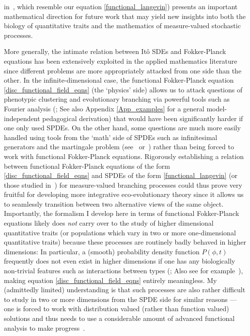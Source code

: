in~\cite{week_white_2021}, which resemble our equation \eqref{functional_langevin}) presents an important mathematical direction for future work that may yield new insights into both the biology of quantitative traits and the mathematics of measure-valued stochastic processes.

More generally, the intimate relation between It\^o SDEs and Fokker-Planck equations has been extensively exploited in the applied mathematics literature~\citep{van_kampen_stochastic_1981,oksendal_stochastic_1998, gardiner_stochastic_2009} since different problems are more appropriately attacked from one side than the other. In the infinite-dimensional case, the functional Fokker-Planck equation \eqref{disc_functional_field_eqns} (the `physics' side) allows us to attack questions of phenotypic clustering and evolutionary branching via powerful tools such as Fourier analysis (\cite{rogers_demographic_2012, rogers_modes_2015}; See also Appendix \ref{App_examples} for a general model-independent pedagogical derivation) that would have been significantly harder if one only used SPDEs. On the other hand, some questions are much more easily handled using tools from the `math' side of SPDEs such as infinitesimal generators and the martingale problem (see~\cite{champagnat_unifying_2006} or~\cite{week_white_2021}) rather than being forced to work with functional Fokker-Planck equations. Rigorously establishing a relation between functional Fokker-Planck equations of the form \eqref{disc_functional_field_eqns} and SPDEs of the form \eqref{functional_langevin} (or those studied in~\cite{week_white_2021}) for measure-valued branching processes could thus prove very fruitful for developing more integrative eco-evolutionary theory since it allows us to seamlessly transition between two alternative views of the same object. Importantly, the formalism I develop here in terms of functional Fokker-Planck equations likely does \emph{not} carry over to the study of higher dimensional quantitative traits (or populations which vary in two or more one-dimensional quantitative traits) because these processes are routinely badly behaved in higher dimensions: In particular, a (smooth) probability density function $P(\phi,t)$ frequently does not even exist in higher dimensions if one has any biologically non-trivial features such as interactions between types (\cite{fleming_measure-valued_1979, walsh_introduction_1986}; Also see for example~\cite{evans_measure-valued_1994}), making equation \eqref{disc_functional_field_eqns} entirely meaningless. My (admittedly limited) understanding is that such processes are also rather difficult to study in two or more dimensions from the SPDE side for similar reasons --- one is forced to work with distribution valued (rather than function valued) solutions and thus needs to use a considerable amount of advanced functional analysis to make progress~\citep{walsh_introduction_1986,carmona_stochastic_1999,balan_gentle_2018}.

